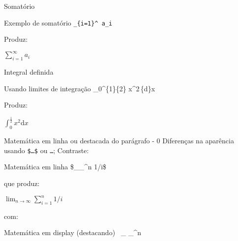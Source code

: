 \begin{frame}{Somatório}
	\begin{Codigo}{Exemplo de somatório}
		\texttt{\string\sum\string_\{i=1\}\string^\string\infty\ a\string_i}
	\end{Codigo}

	\bigskip

    \pause
	Produz:
	
	\begin{Resultado}{}
		$\sum_{i=1}^\infty a_i$
	\end{Resultado}
\end{frame}

\begin{frame}{Integral definida}
	\begin{Codigo}{Usando limites de integração}
			\string\int\string_0\string^\string\frac\{1\}\{2\} x\string^2\string\,\string\mathrm\{d\}x
	\end{Codigo}
	
	\pause
	Produz:
	
	\begin{Resultado}{}
		$\int_0^\frac{1}{2} x^2\mathrm{d}x$
	\end{Resultado}
\end{frame}

\begin{frame}{Matemática em linha ou destacada do parágrafo - 0}
	Diferenças na aparência usando \texttt{\$\dots\$} ou  \texttt{\bs\ls\dots\bs\rs}; \pause Contraste:

	\begin{Codigo}{Matemática em linha}
		\$\_\_\^{}n 1/i\$
	\end{Codigo}
	
	\pause
	que produz:
	
	\begin{Resultado}{}
		$\lim_{n\to\infty}\sum_{i=1}^n1/i$
	\end{Resultado}

    \pause
	com:
	
	\begin{Codigo}{Matemática em display (destacando)}
		\bs\ls\ \_			\_\^{}n
		\ \bs\rs
	\end{Codigo}
\end{frame}

